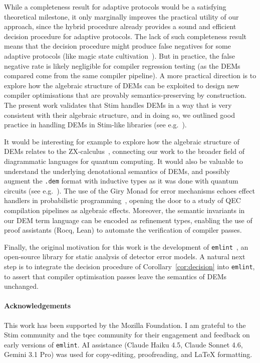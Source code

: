 \documentclass[11pt,a4paper]{article}
\begin{document}
While a completeness result for adaptive protocols would be a satisfying theoretical milestone, it only marginally improves the practical utility of our approach, since the hybrid procedure already provides a sound and efficient decision procedure for adaptive protocols. The lack of such completeness result means that the decision procedure might produce false negatives for some adaptive protocols (like magic state cultivation~\cite{gidney2024magicstatecultivation}). But in practice, the false negative rate is likely negligible for compiler regression testing (as the DEMs compared come from the same compiler pipeline). A more practical direction is to explore how the algebraic structure of DEMs can be exploited to design new compiler optimisations that are provably semantics-preserving by construction. The present work validates that Stim handles DEMs in a way that is very consistent with their algebraic structure, and in doing so, we outlined good practice in handling DEMs in Stim-like libraries (see e.g.~\cite{chase2026clifftfastexactsimulation, fang2026lightstimframeworkqecprotocol}).

It would be interesting for example to explore how the algebraic structure of DEMs relates to the ZX-calculus~\cite{peham2022equivalenceZX, carette2019szx}, connecting our work to the broader field of diagrammatic languages for quantum computing. It would also be valuable to understand the underlying denotational semantics of DEMs, and possibly augment the \texttt{.dem} format with inductive types as it was done with quantum circuits (see e.g.~\cite{pechoux2020, rennelastaton2020}). The use of the Giry Monad for error mechanisms echoes effect handlers in probabilistic programming~\cite{plotkin2013handlingalgebraiceffects}, opening the door to a study of QEC compilation pipelines as algebraic effects. Moreover, the semantic invariants in our DEM term language can be encoded as refinement types, enabling the use of proof assistants (Rocq, Lean) to automate the verification of compiler passes.

Finally, the original motivation for this work is the development of \texttt{emlint}~\cite{emlint}, an open-source library for static analysis of detector error models. A natural next step is to integrate the decision procedure of Corollary~\ref{cor:decision} into \texttt{emlint}, to assert that compiler optimisation passes leave the semantics of DEMs unchanged.

\paragraph*{Acknowledgements}
This work has been supported by the Mozilla Foundation. I am grateful to the Stim community and the tqec community for their engagement and feedback on early versions of \texttt{emlint}. AI assistance (Claude Haiku 4.5, Claude Sonnet 4.6, Gemini 3.1 Pro) was used for copy-editing, proofreading, and LaTeX formatting.



\end{document}

